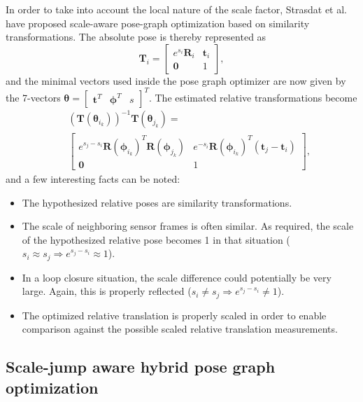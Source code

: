 \documentclass[letterpaper, 10 pt, conference]{ieeeconf}  %
\begin{document}
In order to take into account the local nature of the scale factor, Strasdat et al.~\cite{strasdat10} have proposed scale-aware pose-graph optimization based on similarity transformations. The absolute pose is thereby represented as
%
\begin{equation}
\mathbf{T}_i = \left[\begin{matrix} e^{s_i} \mathbf{R}_i & \mathbf{t}_i \\ \mathbf{0} & 1 \end{matrix}\right],
\end{equation}
%
and the minimal vectors used inside the pose graph optimizer are now given by the 7-vectors $\boldsymbol{\theta} = \left[\begin{matrix}\mathbf{t}^T & \boldsymbol{\phi}^T & s\end{matrix}\right]^T$. The estimated relative transformations become
%
\begin{eqnarray}
& & \left(\mathbf{T}\left(\boldsymbol{\theta}_{i_k}\right)\right)^{-1} \mathbf{T}\left(\boldsymbol{\theta}_{j_k}\right) = \\
& & \left[\begin{matrix}  e^{s_j-s_i} \mathbf{R}(\boldsymbol{\phi}_{i_k})^T\mathbf{R}(\boldsymbol{\phi}_{j_k})  & e^{-s_i} \mathbf{R}(\boldsymbol{\phi}_{i_k})^T (\mathbf{t}_j-\mathbf{t}_i) \\ \mathbf{0} & 1 \end{matrix}\right], \nonumber
\end{eqnarray}
%
and a few interesting facts can be noted:
%
\begin{itemize}
\item The hypothesized relative poses are similarity transformations.
\item The scale of neighboring sensor frames is often similar. As required, the scale of the hypothesized relative pose becomes 1 in that situation ($s_i\approx s_j \Rightarrow e^{s_j-s_i}\approx 1$).
\item In a loop closure situation, the scale difference could potentially be very large. Again, this is properly reflected ($s_i\neq s_j \Rightarrow e^{s_j-s_i}\neq 1$).
\item The optimized relative translation is properly scaled in order to enable comparison against the possible scaled relative translation measurements.
\end{itemize}

\subsection{Scale-jump aware hybrid pose graph optimization}
\end{document}
